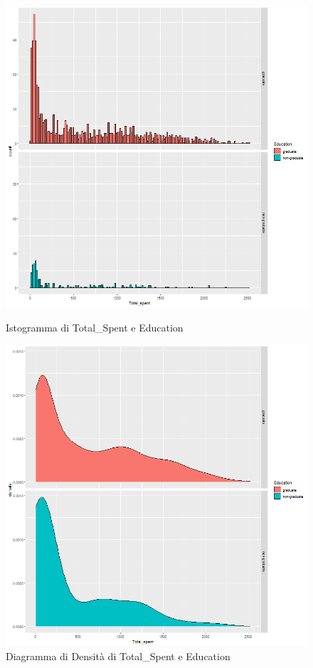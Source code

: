 \documentclass[letterpaper,11pt]{article}
\begin{document}
\begin{figure}[h]
  \centering
  \begin{minipage}[b]{0.4\textwidth}
    \includegraphics[width=\textwidth]{Img/EDA/EDA030.png}
    \caption{Istogramma di Total\_Spent e Education}
    \label{fig:IstogrammaTsEducation}
  \end{minipage}
  \hfill
  \begin{minipage}[b]{0.4\textwidth}
    \includegraphics[width=\textwidth]{Img/EDA/EDA031.png}
    \caption{Diagramma di Densità di Total\_Spent e Education}
     \label{fig:DensitaTsEducation}
  \end{minipage}
\end{figure}
\end{document}
